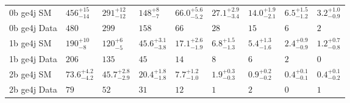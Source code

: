 \begin{center}
\begin{table}[h!]
\begin{tabular}{ lllllllll }
\hline
0b ge4j SM \T   & $456^{+15}_{-14}$              & $291^{+12}_{-12}$              & $148^{+8}_{-7}$                & $66.0^{+5.6}_{-5.2}$           & $27.1^{+2.9}_{-3.4}$           & $14.0^{+1.9}_{-2.1}$           & $6.5^{+1.5}_{-1.2}$            & $3.2^{+1.0}_{-0.9}$            \\ 
0b ge4j Data \T & $480$                          & $299$                          & $158$                          & $66$                           & $28$                           & $15$                           & $6$                            & $2$                            \\ 
\hline
1b ge4j SM \T   & $190^{+10}_{-8}$               & $120^{+6}_{-5}$                & $45.6^{+3.1}_{-3.8}$           & $17.1^{+2.6}_{-1.9}$           & $6.8^{+1.5}_{-1.3}$            & $5.4^{+1.3}_{-1.6}$            & $2.4^{+0.9}_{-0.9}$            & $1.2^{+0.7}_{-0.8}$            \\ 
1b ge4j Data \T & $206$                          & $135$                          & $45$                           & $14$                           & $8$                            & $6$                            & $2$                            & $0$                            \\ 
\hline
2b ge4j SM \T   & $73.6^{+4.2}_{-4.2}$           & $45.7^{+2.8}_{-2.9}$           & $20.4^{+1.8}_{-1.8}$           & $7.7^{+1.2}_{-1.0}$            & $1.9^{+0.3}_{-0.3}$            & $0.9^{+0.2}_{-0.2}$            & $0.4^{+0.1}_{-0.1}$            & $0.4^{+0.1}_{-0.2}$            \\ 
2b ge4j Data \T & $79$                           & $52$                           & $31$                           & $12$                           & $1$                            & $2$                            & $0$                            & $1$                            \\ 
\hline
  \end{tabular}
\end{table}
\end{center}

